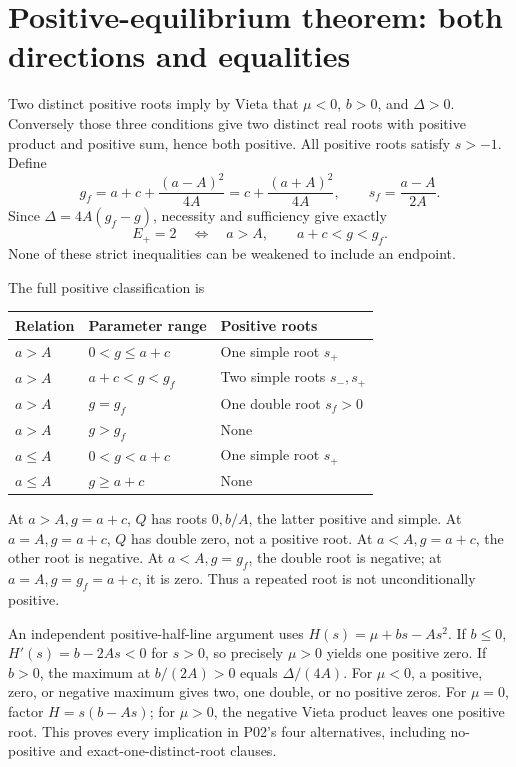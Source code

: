 \documentclass[11pt]{article}
\begin{document}
\section{Positive-equilibrium theorem: both directions and equalities}

Two distinct positive roots imply by Vieta that \(\mu<0\), \(b>0\),
and \(\Delta>0\). Conversely those three conditions give two distinct
real roots with positive product and positive sum, hence both positive.
All positive roots satisfy \(s>-1\). Define
\begin{equation}\label{A02:gf}
g_f=a+c+\frac{(a-A)^2}{4A}
=c+\frac{(a+A)^2}{4A},\qquad
s_f=\frac{a-A}{2A}.
\end{equation}
Since \(\Delta=4A(g_f-g)\), necessity and sufficiency give exactly
\begin{equation}\label{A02:two}
E_+=2\quad\Longleftrightarrow\quad
a>A,\qquad a+c<g<g_f.
\end{equation}
None of these strict inequalities can be weakened to include an endpoint.

The full positive classification is
\begin{center}
\begin{tabular}{@{}lll@{}}
\toprule
Relation & Parameter range & Positive roots\\
\midrule
\(a>A\)& \(0<g\le a+c\)& One simple root \(s_+\)\\
\(a>A\)& \(a+c<g<g_f\)& Two simple roots \(s_-,s_+\)\\
\(a>A\)& \(g=g_f\)& One double root \(s_f>0\)\\
\(a>A\)& \(g>g_f\)& None\\
\(a\le A\)& \(0<g<a+c\)& One simple root \(s_+\)\\
\(a\le A\)& \(g\ge a+c\)& None\\
\bottomrule
\end{tabular}
\end{center}
At \(a>A,g=a+c\), \(Q\) has roots \(0,b/A\), the latter positive
and simple. At \(a=A,g=a+c\), \(Q\) has double zero, not a positive
root. At \(a<A,g=a+c\), the other root is negative.
At \(a<A,g=g_f\), the double root is negative; at
\(a=A,g=g_f=a+c\), it is zero. Thus a repeated root is not
unconditionally positive.

An independent positive-half-line argument uses
\(H(s)=\mu+bs-As^2\). If \(b\le0\), \(H'(s)=b-2As<0\)
for \(s>0\), so precisely \(\mu>0\) yields one positive zero.
If \(b>0\), the maximum at \(b/(2A)>0\) equals \(\Delta/(4A)\).
For \(\mu<0\), a positive, zero, or negative maximum gives two,
one double, or no positive zeros. For \(\mu=0\), factor
\(H=s(b-As)\); for \(\mu>0\), the negative Vieta product leaves
one positive root. This proves every implication in P02's four
alternatives, including no-positive and exact-one-distinct-root clauses.
\end{document}
